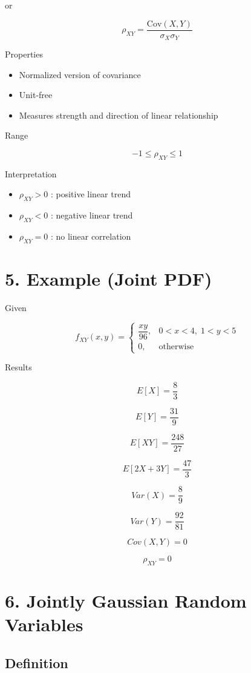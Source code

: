 \documentclass[11pt]{article}
\begin{document}
or

\[
\rho_{XY} =
\frac{\text{Cov}(X,Y)}{\sigma_X\sigma_Y}
\]

Properties

\begin{itemize}
\item Normalized version of covariance
\item Unit-free
\item Measures strength and direction of linear relationship
\end{itemize}

Range

\[
-1 \le \rho_{XY} \le 1
\]

Interpretation

\begin{itemize}
\item $\rho_{XY} > 0$ : positive linear trend
\item $\rho_{XY} < 0$ : negative linear trend
\item $\rho_{XY} = 0$ : no linear correlation
\end{itemize}

\section*{5. Example (Joint PDF)}

Given

\[
f_{XY}(x,y)=
\begin{cases}
\dfrac{xy}{96}, & 0<x<4,\; 1<y<5 \\
0, & \text{otherwise}
\end{cases}
\]

Results

\[
E[X] = \frac{8}{3}
\]

\[
E[Y] = \frac{31}{9}
\]

\[
E[XY] = \frac{248}{27}
\]

\[
E[2X+3Y] = \frac{47}{3}
\]

\[
Var(X) = \frac{8}{9}
\]

\[
Var(Y) = \frac{92}{81}
\]

\[
Cov(X,Y)=0
\]

\[
\rho_{XY}=0
\]

\section*{6. Jointly Gaussian Random Variables}

\subsection*{Definition}
\end{document}
